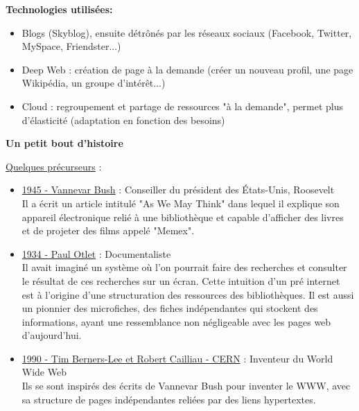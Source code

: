 \vspace{0.3cm}
\textbf{Technologies utilisées:}
    \begin{itemize}
        \item Blogs (Skyblog), ensuite détrônés par les réseaux sociaux (Facebook, Twitter, MySpace, Friendster...)
        \item Deep Web : création de page à la demande (créer un nouveau profil, une page Wikipédia, un groupe d'intérêt...)
        \item Cloud : regroupement et partage de ressources "à la demande", permet plus d'élasticité (adaptation en fonction des besoins)
    \end{itemize}

\vspace{0.5cm}

\begin{framed}
    \textbf{Un petit bout d'histoire}
    
    \vspace{0.3cm}
    
    \underline{Quelques précurseurs} :
    
    \begin{itemize}
        \item \underline{1945 - Vannevar Bush} : Conseiller du président des États-Unis, Roosevelt\\ 
        Il a écrit un article intitulé "As We May Think" dans lequel il explique son appareil électronique relié à une bibliothèque et capable d'afficher des livres et de projeter des films appelé "Memex".
        \item \underline{1934 - Paul Otlet} : Documentaliste\\ 
        Il avait imaginé un système où l'on pourrait faire des recherches et consulter le résultat de ces recherches sur un écran. Cette intuition d'un pré internet est à l'origine d'une structuration des ressources des bibliothèques. Il est aussi un pionnier des microfiches, des fiches indépendantes qui stockent des informations, ayant une ressemblance non négligeable avec les pages web d'aujourd'hui.
        \item \underline{1990 - Tim Berners-Lee et  Robert Cailliau - CERN} : Inventeur du World Wide Web\\
        Ils se sont inspirés des écrits de Vannevar Bush pour inventer le WWW, avec sa structure de pages indépendantes reliées par des liens hypertextes.
    \end{itemize}
\end{framed}    
\vspace{0.5cm}


